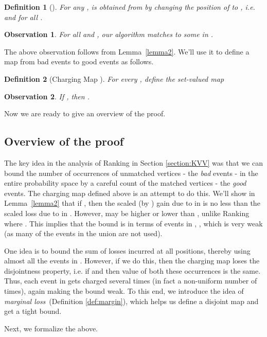 \documentclass[11pt]{article}
\newtheorem{definition}{Definition}
\newtheorem{observation}{Observation}
\begin{document}
\begin{definition}[]
For any ,  is obtained from  by
changing the position of  to , i.e.  and
 for all .
\end{definition}

\begin{observation}
For all  and , our algorithm
matches  to some  in .
\end{observation}
The above observation follows from Lemma~\ref{lemma2}. We'll use it
to define a map from bad events to good events as follows.

\begin{definition}[Charging Map ]
\label{def:map}
For every , define the set-valued
map 
\end{definition}

\begin{observation}
\label{obs1}
If , then .
\end{observation}


Now we are ready to give an overview of the proof.

\subsection*{Overview of the proof}
The key idea in the analysis of {\sc Ranking} in Section
\ref{section:KVV} was that we can bound the number of occurrences of
unmatched vertices - the \emph{bad} events - in the entire probability
space by a careful count of the matched vertices - the \emph{good}
events. The charging map  defined above is an attempt to do this.
We'll show in Lemma~\ref{lemma2} that if , then the scaled (by ) gain due to  in
 is no less than the scaled loss due to  in
. However,  may be higher or lower than , unlike {\sc
  Ranking} where . This implies that the bound is in terms
of events in , , which is very weak (as
many of the events in the union are not used). 

One idea is to bound the sum of losses incurred at all positions,
thereby using almost all the events in . However, if we do this,
then the charging map loses the disjointness property, i.e. if
 and  then 
value of both these occurrences is the same. Thus, each event in
 gets charged several times (in fact a non-uniform number
of times), again making the bound weak. To this end, we introduce the idea of {\em marginal loss}~(Definition \ref{def:margin}), which helps us define a disjoint map and get a tight bound.

Next, we formalize the above.
\end{document}

